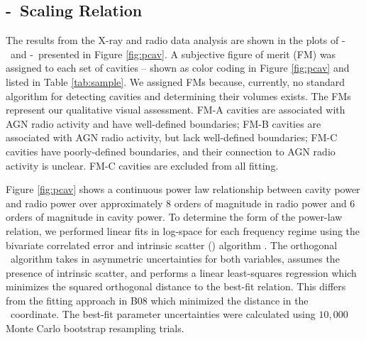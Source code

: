 \documentclass{emulateapj}
\begin{document}
\subsection{\pjet-\prad\ Scaling Relation}
\label{sec:relation}

The results from the X-ray and radio data analysis are shown in the
plots of \pcav-\phigh\ and \pcav-\plow\ presented in Figure
\ref{fig:pcav}. A subjective figure of merit (FM) was assigned to
each set of cavities -- shown as color coding in Figure \ref{fig:pcav}
and listed in Table \ref{tab:sample}. We assigned FMs because,
currently, no standard algorithm for detecting cavities and
determining their volumes exists. The FMs represent our qualitative
visual assessment. FM-A cavities are associated with AGN radio
activity and have well-defined boundaries; FM-B cavities are
associated with AGN radio activity, but lack well-defined boundaries;
FM-C cavities have poorly-defined boundaries, and their connection to
AGN radio activity is unclear. FM-C cavities are excluded from all
fitting.

Figure \ref{fig:pcav} shows a continuous power law relationship
between cavity power and radio power over approximately 8 orders of
magnitude in radio power and 6 orders of magnitude in cavity power. To
determine the form of the power-law relation, we performed linear fits
in log-space for each frequency regime using the bivariate correlated
error and intrinsic scatter (\bces) algorithm \citep{bces}. The
orthogonal \bces\ algorithm takes in asymmetric uncertainties for both
variables, assumes the presence of intrinsic scatter, and performs a
linear least-squares regression which minimizes the squared orthogonal
distance to the best-fit relation. This differs from the fitting
approach in B08 which minimized the distance in the
\pcav\ coordinate. The best-fit parameter uncertainties were
calculated using $10,000$ Monte Carlo bootstrap resampling trials.
\end{document}

